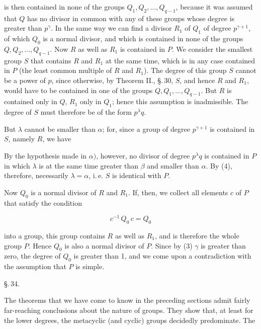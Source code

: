 is then contained in none of the groups $Q_1, Q_2, \dots, Q_{q-1}$, because it was assumed that $Q$ has no divisor in common with any of these groups whose degree is greater than $p^{\gamma}$. In the same way we can find a divisor $R_1$ of $Q_1$ of degree $p^{\gamma+1}$, of which $Q_0$ is a normal divisor, and which is contained in none of the groups $Q, Q_2, \dots, Q_{q-1}$. Now $R$ as well as $R_1$ is contained in $P$. We consider the smallest group $S$ that contains $R$ and $R_1$ at the same time, which is in any case contained in $P$ (the least common multiple of $R$ and $R_1$). The degree of this group $S$ cannot be a power of $p$, since otherwise, by Theorem II., \S.\,30, $S$, and hence $R$ and $R_1$, would have to be contained in one of the groups $Q, Q_1, \dots, Q_{q-1}$. But $R$ is contained only in $Q$, $R_1$ only in $Q_1$; hence this assumption is inadmissible. The degree of $S$ must therefore be of the form $p^{\lambda} q$.

But $\lambda$ cannot be smaller than $\alpha$; for, since a group of degree $p^{\gamma+1}$ is contained in $S$, namely $R$, we have


By the hypothesis made in $\alpha)$, however, no divisor of degree $p^{\lambda} q$ is contained in $P$ in which $\lambda$ is at the same time greater than $\beta$ and smaller than $\alpha$. By (4), therefore, necessarily $\lambda = \alpha$, i.\,e. $S$ is identical with $P$.

Now $Q_0$ is a normal divisor of $R$ and $R_1$. If, then, we collect all elements $c$ of $P$ that satisfy the condition

\[ c^{-1}\,Q_0\,c = Q_0 \]

into a group, this group contains $R$ as well as $R_1$, and is therefore the whole group $P$. Hence $Q_0$ is also a normal divisor of $P$. Since by (3) $\gamma$ is greater than zero, the degree of $Q_0$ is greater than 1, and we come upon a contradiction with the assumption that $P$ is simple.

\begin{center}
\S.\,34.

\end{center}

The theorems that we have come to know in the preceding sections admit fairly far-reaching conclusions about the nature of groups. They show that, at least for the lower degrees, the metacyclic (and cyclic) groups decidedly predominate. The
